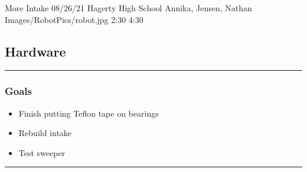 \insertmeeting 
	{More Intake} 
	{08/26/21}
	{Hagerty High School}
	{Annika, Jensen, Nathan}
	{Images/RobotPics/robot.jpg}
	{2:30}
  {4:30}
	
\subsection*{Hardware}
\noindent\hfil\rule{\textwidth}{.4pt}\hfil
\subsubsection*{Goals}
\begin{itemize}
    \item Finish putting Teflon tape on bearings
		\item Rebuild intake
		\item Test sweeper
  

\end{itemize} 

\noindent\hfil\rule{\textwidth}{.4pt}\hfil

